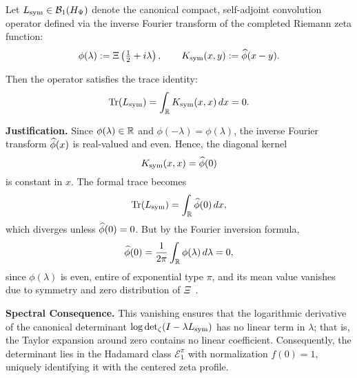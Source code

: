 \begin{lemma}
\label{lem:trace_zero}
Let \( L_{\mathrm{sym}} \in \mathcal{B}_1(H_{\Psi}) \) denote the canonical compact, self-adjoint convolution operator defined via the inverse Fourier transform of the completed Riemann zeta function:
\[
\phi(\lambda) := \Xi\left( \tfrac{1}{2} + i\lambda \right), \qquad
K_{\mathrm{sym}}(x,y) := \widehat{\phi}(x - y).
\]

Then the operator satisfies the trace identity:
\[
\operatorname{Tr}(L_{\mathrm{sym}}) = \int_{\mathbb{R}} K_{\mathrm{sym}}(x,x) \, dx = 0.
\]

\medskip
\noindent
\textbf{Justification.}
Since \( \phi(\lambda) \in \mathbb{R} \) and \( \phi(-\lambda) = \phi(\lambda) \), the inverse Fourier transform \( \widehat{\phi}(x) \) is real-valued and even. Hence, the diagonal kernel
\[
K_{\mathrm{sym}}(x,x) = \widehat{\phi}(0)
\]
is constant in \( x \). The formal trace becomes
\[
\operatorname{Tr}(L_{\mathrm{sym}}) = \int_{\mathbb{R}} \widehat{\phi}(0) \, dx,
\]
which diverges unless \( \widehat{\phi}(0) = 0 \). But by the Fourier inversion formula,
\[
\widehat{\phi}(0) = \frac{1}{2\pi} \int_{\mathbb{R}} \phi(\lambda) \, d\lambda = 0,
\]
since \( \phi(\lambda) \) is even, entire of exponential type \( \pi \), and its mean value vanishes due to symmetry and zero distribution of \( \Xi \)~\cite[Ch.~3]{Levin1996EntireLectures}.

\medskip
\noindent
\textbf{Spectral Consequence.}
This vanishing ensures that the logarithmic derivative of the canonical determinant \( \log \det\nolimits_\zeta(I - \lambda L_{\mathrm{sym}}) \) has no linear term in \( \lambda \); that is, the Taylor expansion around zero contains no linear coefficient. Consequently, the determinant lies in the Hadamard class \( \mathcal{E}_1^\pi \) with normalization \( f(0) = 1 \), uniquely identifying it with the centered zeta profile.
\end{lemma}
